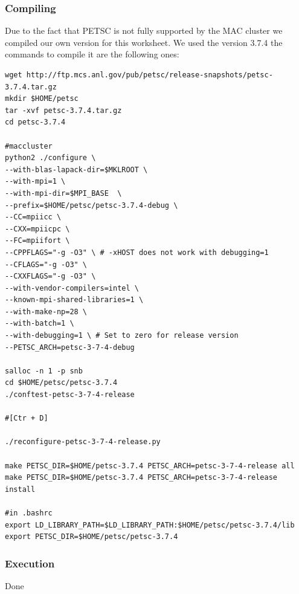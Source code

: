 \documentclass[a4paper]{article}
\begin{document}
\subsubsection{Compiling}
Due to the fact that PETSC is not fully supported by the MAC cluster we compiled our own version for this worksheet. We used the version 3.7.4 the commands to compile it are the following ones:
\begin{lstlisting}[caption=Debug version]
wget http://ftp.mcs.anl.gov/pub/petsc/release-snapshots/petsc-3.7.4.tar.gz
mkdir $HOME/petsc
tar -xvf petsc-3.7.4.tar.gz
cd petsc-3.7.4

#maccluster
python2 ./configure \
--with-blas-lapack-dir=$MKLROOT \
--with-mpi=1 \
--with-mpi-dir=$MPI_BASE  \
--prefix=$HOME/petsc/petsc-3.7.4-debug \
--CC=mpiicc \
--CXX=mpiicpc \
--FC=mpiifort \
--CPPFLAGS="-g -O3" \ # -xHOST does not work with debugging=1
--CFLAGS="-g -O3" \
--CXXFLAGS="-g -O3" \
--with-vendor-compilers=intel \
--known-mpi-shared-libraries=1 \
--with-make-np=28 \
--with-batch=1 \
--with-debugging=1 \ # Set to zero for release version
--PETSC_ARCH=petsc-3-7-4-debug

salloc -n 1 -p snb
cd $HOME/petsc/petsc-3.7.4
./conftest-petsc-3-7-4-release

#[Ctr + D]

./reconfigure-petsc-3-7-4-release.py

make PETSC_DIR=$HOME/petsc-3.7.4 PETSC_ARCH=petsc-3-7-4-release all
make PETSC_DIR=$HOME/petsc-3.7.4 PETSC_ARCH=petsc-3-7-4-release install

#in .bashrc
export LD_LIBRARY_PATH=$LD_LIBRARY_PATH:$HOME/petsc/petsc-3.7.4/lib
export PETSC_DIR=$HOME/petsc/petsc-3.7.4
\end{lstlisting}





\subsubsection{Execution}
Done
\end{document}
